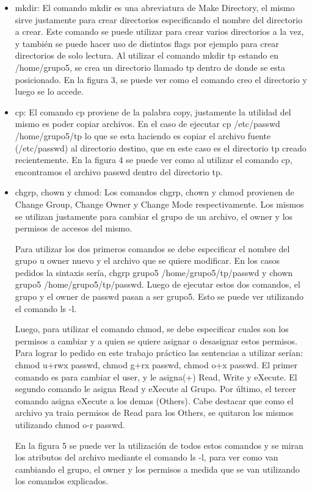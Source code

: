 \documentclass[a4paper, 12pt]{article}
\begin{document}
\begin{itemize}
\item mkdir: El comando mkdir es una abreviatura de Make Directory, el mismo sirve justamente para crear directorios especificando el nombre del directorio a crear. Este comando se puede utilizar para crear varios directorios a la vez, y tambi\'en se puede hacer uso de distintos flags por ejemplo para crear directorios de solo lectura. Al utilizar el comando mkdir tp estando en /home/grupo5, se crea un directorio llamado tp dentro de donde se esta posicionado. En la figura 3, se puede ver como el comando creo el directorio y luego se lo accede.

\item cp: El comando cp proviene de la palabra copy, justamente la utilidad del mismo es poder copiar archivos. En el caso de ejecutar cp /etc/passwd /home/grupo5/tp lo que se esta haciendo es copiar el archivo fuente (/etc/passwd) al directorio destino, que en este caso es el directorio tp creado recientemente. En la figura 4 se puede ver como al utilizar el comando cp, encontramos el archivo passwd dentro del directorio tp.

\item chgrp, chown y chmod: Los comandos chgrp, chown y chmod provienen de Change Group, Change Owner y Change Mode respectivamente. Los mismos se utilizan justamente para cambiar el grupo de un archivo, el owner y los permisos de accesos del mismo. 

Para utilizar los dos primeros comandos se debe especificar el nombre del grupo u owner nuevo y el archivo que se quiere modificar. En los casos pedidos la sintaxis ser\'ia, chgrp grupo5 /home/grupo5/tp/passwd y chown grupo5 /home/grupo5/tp/passwd. Luego de ejecutar estos dos comandos, el grupo y el owner de passwd pasan a ser grupo5. Esto se puede ver utilizando el comando ls -l.

Luego, para utilizar el comando chmod, se debe especificar cuales son los permisos a cambiar y a quien se quiere asignar o desasignar estos permisos. Para lograr lo pedido en este trabajo pr\'actico las sentencias a utilizar ser\'ian: chmod u+rwx passwd, chmod g+rx passwd, chmod o+x passwd. El primer comando es para cambiar el user, y le asigna(+) Read, Write y eXecute. El segundo comando le asigna Read y eXecute al Grupo. Por \'ultimo, el tercer comando asigna eXecute a los demas (Others). Cabe destacar que como el archivo ya traia permisos de Read para los Others, se quitaron los mismos utilizando chmod o-r passwd.

En la figura 5 se puede ver la utilizaci\'on de todos estos comandos y se miran los atributos del archivo mediante el comando ls -l, para ver como van cambiando el grupo, el owner y los permisos a medida que se van utilizando los comandos explicados.


\end{itemize}
\end{document}
